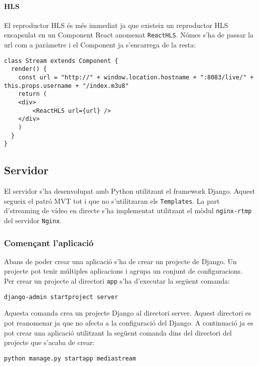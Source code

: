 \documentclass[12pt, titlepage]{article}
\begin{document}
\paragraph{HLS}

El reproductor HLS és més immediat ja que existeix un reproductor HLS encapsulat
en un Component React anomenat \verb|ReactHLS|. Nómes s'ha de passar la url com
a paràmetre i el Component ja s'encarrega de la resta:

\begin{lstlisting}[breaklines]
class Stream extends Component {
  render() {
    const url = "http://" + window.location.hostname + ":8083/live/" + this.props.username + "/index.m3u8"
    return (
    <div>
        <ReactHLS url={url} />
    </div>
    )
  }
}
\end{lstlisting}

\subsection{Servidor}


El servidor s'ha desenvolupat amb Python utilitzant el framework Django. Aquest
segueix el patró MVT tot i que no s'utilitzaran els \verb|Templates|. La part
d'streaming de vídeo en directe s'ha implementat utilitzant el mòdul \verb|nginx-rtmp| del
servidor \verb|Nginx|.

\subsubsection{Començant l'aplicació}

Abans de poder crear una aplicació s'ha de crear un projecte de Django. Un projecte
pot tenir múltiples aplicacions i agrupa un conjunt de configuracions. Per crear un
projecte al directori \verb|app| s'ha d'executar la següent comanda:

\begin{lstlisting}
django-admin startproject server
\end{lstlisting}

Aquesta comanda crea un projecte Django al directori server. Aquest directori es pot
reanomenar ja que no afecta a la configuració del Django. A continuació ja es pot
crear una aplicació utilitzant la següent comanda dins del directori del projecte
que s'acaba de crear:

\begin{lstlisting}
python manage.py startapp mediastream
\end{lstlisting}
\end{document}
